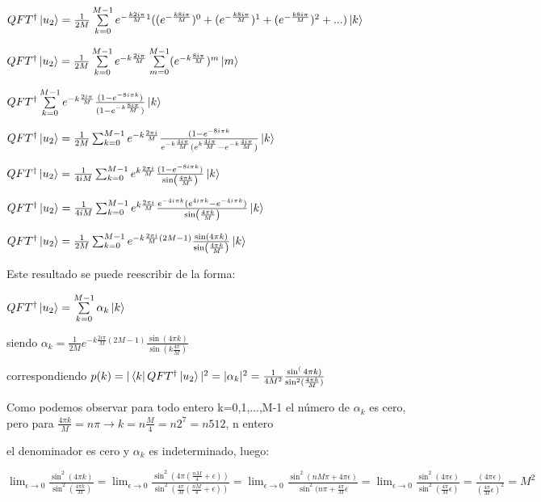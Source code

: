 $QFT^\dagger \ket{u_2} = \frac{1}{2M} \sum\limits_{k=0}^{M-1} e^{- \frac{k 2 i \pi}{M} 1} ((e^{- \frac{k 8 i \pi}{M}})^0 + (e^{- \frac{k 8 i \pi}{M}})^1 + (e^{- \frac{k 8 i \pi}{M}})^2 + ...) \ket{k}$

$QFT^\dagger \ket{u_2} = \frac{1}{2M} \sum\limits_{k=0}^{M-1} e^{-k \frac{2 i \pi}{M}} \sum\limits_{m=0}^{M-1} (e^{-k \frac{8 i \pi}{M}})^m \ket{m}$

$QFT^\dagger \sum\limits_{k=0}^{M-1} e^{-k \frac{2 i \pi}{M}} \frac{(1-e^{-8 i \pi k})}{(1 - e^{-k \frac{8 i \pi}{M}})} \ket{k}$

$QFT^\dagger \ket{u_2} = \frac{1}{2M} \sum_{k=0}^{M-1} e^{-k \frac{2 \pi i}{M}} \frac{(1 - e^{-8 i \pi k}}{e^{-k \frac{4 i \pi}{M}} (e^{k \frac{4 i \pi}{M}} - e^{-k \frac{4 i \pi}{M}})} \ket{k}$

$QFT^\dagger \ket{u_2} = \frac{1}{4 i M} \sum_{k=0}^{M-1} e^{k \frac{2 \pi i}{M}} \frac{(1 - e^{-8 i \pi k})}{\sin(\frac{4\pi k}{M})} \ket{k}$

$QFT^\dagger \ket{u_2} = \frac{1}{4 i M} \sum_{k=0}^{M-1} e^{k \frac{2 \pi i}{M}} \frac{e^{-4 i \pi k} (e^{4 i \pi k} - e^{-4 i \pi k})}{\sin(\frac{4\pi k}{M})} \ket{k}$

$QFT^\dagger \ket{u_2} = \frac{1}{2M} \sum_{k=0}^{M-1} e^{-k \frac{2 \pi i}{M} (2M-1)} \frac{\sin(4\pi k)}{\sin(\frac{4\pi k}{M})} \ket{k}$

Este resultado se puede reescribir de la forma:

$QFT^\dagger \ket{u_2} = \sum\limits_{k=0}^{M-1} \alpha_k \ket{k}$

siendo $\alpha_k = \frac{1}{2M} e^{-k \frac{2 i \pi}{M} (2M-1)} \frac{\sin(4 \pi k)}{\sin(k \frac{4 \pi}{M})}$

correspondiendo $p(k) = |\bra{k} QFT^\dagger \ket{u_2}|^2 = |\alpha_k|^2 = \frac{1}{4M^2} \frac{\sin^(4\pi k)}{\sin^2(\frac{4 \pi k}{M})}$

Como podemos observar para todo entero k=0,1,...,M-1 el número de $\alpha_k$ es cero, pero para $\frac{4 \pi k}{M} = n \pi \rightarrow k = n \frac{M}{4} = n 2^7 = n 512$, n entero

el denominador es cero y $\alpha_k$ es indeterminado, luego:

$\lim_{\epsilon \to 0} \frac{\sin^2(4 \pi k)}{\sin^2(\frac{4\pi k}{M})} = \lim_{\epsilon \to 0} \frac{\sin^2(4 \pi (\frac{n M}{4} + \epsilon))}{\sin^2(\frac{4\pi}{M} (\frac{n M}{4} + \epsilon))} = \lim_{\epsilon \to 0} \frac{\sin^2(n M \pi + 4 \pi \epsilon)}{\sin^2(n \pi + \frac{4\pi}{M} \epsilon} = \lim_{\epsilon \to 0} \frac{\sin^2(4 \pi \epsilon)}{\sin^2(\frac{4 \pi}{M} \epsilon)} = \frac{(4 \pi \epsilon)}{(\frac{4 \pi}{M} \epsilon)^2} = M^2$

